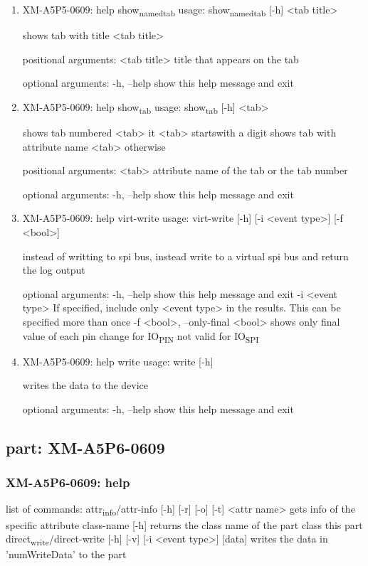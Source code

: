 \documentclass[11pt]{article}
\begin{document}
\begin{enumerate}
\item XM-A5P5-0609: help show\textsubscript{named}\textsubscript{tab}
\label{sec:org8effffd}
usage: show\textsubscript{named}\textsubscript{tab} [-h] <tab title>

shows tab with title <tab title>

positional arguments:
  <tab title>  title that appears on the tab

optional arguments:
  -h, --help   show this help message and exit

\item XM-A5P5-0609: help show\textsubscript{tab}
\label{sec:org46f322b}
usage: show\textsubscript{tab} [-h] <tab>

shows tab numbered <tab> it <tab> startswith a digit shows tab with attribute
name <tab> otherwise

positional arguments:
  <tab>       attribute name of the tab or the tab number

optional arguments:
  -h, --help  show this help message and exit

\item XM-A5P5-0609: help virt-write
\label{sec:org2683afd}
usage: virt-write [-h] [-i <event type>] [-f <bool>]

instead of writting to spi bus, instead write to a virtual spi bus and return
the log output

optional arguments:
  -h, --help            show this help message and exit
  -i <event type>       If specified, include only <event type> in the
                        results. This can be specified more than once
  -f <bool>, --only-final <bool>
                        shows only final value of each pin change for IO\textsubscript{PIN}
                        not valid for IO\textsubscript{SPI}

\item XM-A5P5-0609: help write
\label{sec:org9748efe}
usage: write [-h]

writes the data to the device

optional arguments:
  -h, --help  show this help message and exit
\end{enumerate}

\subsection{part: XM-A5P6-0609}
\label{sec:org9e5c7df}
\subsubsection{XM-A5P6-0609: help}
\label{sec:orgfdd71c0}
list of commands:
  attr\textsubscript{info}/attr-info [-h] [-r] [-o] [-t] <attr name>
    gets info of the specific attribute
  class-name [-h]
    returns the class name of the part class this part
  direct\textsubscript{write}/direct-write [-h] [-v] [-i <event type>] [data]
    writes the data in 'numWriteData' to the part
\end{document}
